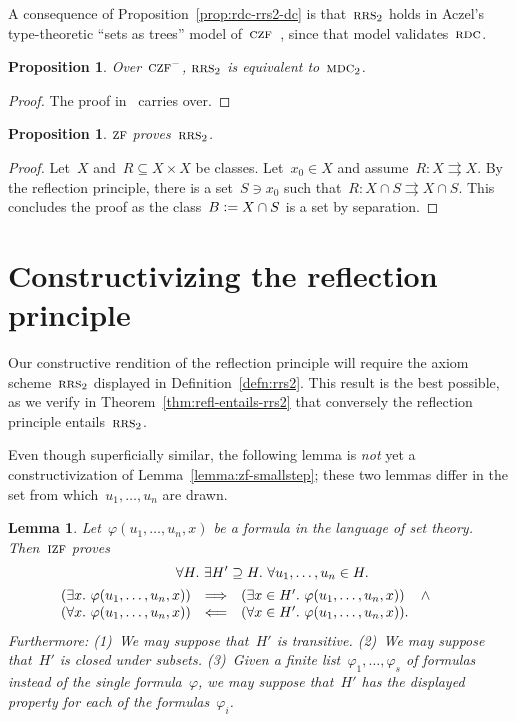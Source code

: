 \documentclass[oneside,reqno]{amsart}
\theoremstyle{definition}
\theoremstyle{plain}
\newtheorem{prop}[defn]{Proposition}
\newtheorem{lemma}[defn]{Lemma}
\theoremstyle{remark}
\newcommand{\defeq}{\vcentcolon=}
\renewcommand{\_}{\mathpunct{.}\,}
\newcommand{\?}{\,{:}\,}
\newcommand{\ZF}{\textsc{zf}}
\newcommand{\IZF}{\textsc{izf}}
\newcommand{\CZF}{\textsc{czf}}
\newcommand{\RRS}{\textsc{rrs}}
\newcommand{\RDC}{\textsc{rdc}}
\newcommand{\MDC}{\textsc{mdc}}
\begin{document}
A consequence of Proposition~\ref{prop:rdc-rrs2-dc} is that~$\RRS_2$ holds in
Aczel's type-theoretic ``sets as trees'' model
of~$\CZF$~\cite{aczel:sets-as-trees}, since that model validates~$\RDC$.

\begin{prop}Over~$\CZF^-$, $\RRS_2$ is equivalent to~$\MDC_2$.\end{prop}

\begin{proof}The proof in~\cite{palmgren:mdc} carries over.\end{proof}

\begin{prop}\label{prop:zf-rrs2}
$\ZF$ proves~$\RRS_2$.\end{prop}

\begin{proof}Let~$X$ and~$R \subseteq X \times X$ be classes. Let~$x_0 \in X$
and assume~$R : X \rightrightarrows X$. By the reflection principle, there is a
set~$S \ni x_0$ such that~$R : X \cap S \rightrightarrows X \cap S$. This
concludes the proof as the class~$B \defeq X \cap S$ is a set by separation.
\end{proof}

\section{Constructivizing the reflection principle}
\label{sect:constructive-proof}

Our constructive rendition of the reflection principle will require the axiom
scheme~$\RRS_2$ displayed in Definition~\ref{defn:rrs2}. This result is the
best possible, as we verify in Theorem~\ref{thm:refl-entails-rrs2} that
conversely the reflection principle entails~$\RRS_2$.

Even though superficially similar, the following lemma is \emph{not} yet a
constructivization of Lemma~\ref{lemma:zf-smallstep}; these two lemmas differ
in the set from which~$u_1,\ldots,u_n$ are drawn.

\begin{lemma}\label{lemma:izf-microstep}
Let~$\varphi(u_1,\ldots,u_n,x)$ be a formula in the language of set
theory. Then~$\IZF$ proves
\begin{multline*}
  {\qquad}\forall H\_
  \exists H' \supseteq H\_
  \forall u_1,\ldots,u_n \in H\_ \\
  \begin{array}{@{}rcl@{}}
  (\exists x\_ \varphi(u_1,\ldots,u_n,x)) &\Longrightarrow&
  (\exists x \in H'\_ \varphi(u_1,\ldots,u_n,x)) \quad\mathop{\wedge} \\
  (\forall x\_ \varphi(u_1,\ldots,u_n,x)) &\Longleftarrow&
  (\forall x \in H'\_ \varphi(u_1,\ldots,u_n,x)).\end{array}
  {\qquad}
\end{multline*}
Furthermore: (1)~We may suppose that~$H'$ is transitive. (2)~We may suppose
that~$H'$ is closed under subsets. (3)~Given a finite
list~$\varphi_1,\ldots,\varphi_s$ of formulas instead of the single
formula~$\varphi$, we may suppose that~$H'$ has the displayed property for each
of the formulas~$\varphi_i$.
\end{lemma}
\end{document}
